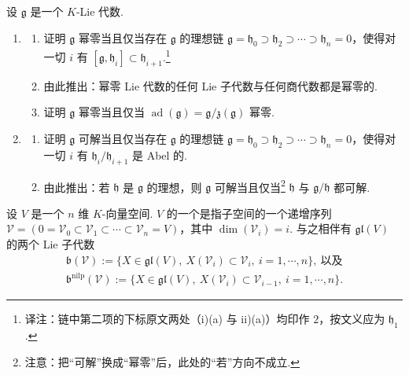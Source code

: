 \begin{exercise*}
设 $\mathfrak{g}$ 是一个 $K$-Lie 代数.
\begin{enumerate}[label=\roman*)]
\item
\begin{enumerate}[label=(\alph*)]
\item 证明 $\mathfrak{g}$ 幂零当且仅当存在 $\mathfrak{g}$ 的理想链 $\mathfrak{g} = \mathfrak{h}_0 \supset \mathfrak{h}_2 \supset \cdots \supset \mathfrak{h}_n = 0$，使得对一切 $i$ 有 $[\mathfrak{g}, \mathfrak{h}_i] \subset \mathfrak{h}_{i+1}$.\footnote{译注：链中第二项的下标原文两处（i)(a) 与 ii)(a)）均印作 $2$，按文义应为 $\mathfrak{h}_1$.}
\item 由此推出：幂零 Lie 代数的任何 Lie 子代数与任何商代数都是幂零的.
\item 证明 $\mathfrak{g}$ 幂零当且仅当 $\operatorname{ad}(\mathfrak{g}) = \mathfrak{g}/\mathfrak{z}(\mathfrak{g})$ 幂零.
\end{enumerate}
\item
\begin{enumerate}[label=(\alph*)]
\item 证明 $\mathfrak{g}$ 可解当且仅当存在 $\mathfrak{g}$ 的理想链 $\mathfrak{g} = \mathfrak{h}_0 \supset \mathfrak{h}_2 \supset \cdots \supset \mathfrak{h}_n = 0$，使得对一切 $i$ 有 $\mathfrak{h}_i/\mathfrak{h}_{i+1}$ 是 Abel 的.
\item 由此推出：若 $\mathfrak{h}$ 是 $\mathfrak{g}$ 的理想，则 $\mathfrak{g}$ 可解当且仅当\footnote{注意：把``可解''换成``幂零''后，此处的``若''方向不成立.} $\mathfrak{h}$ 与 $\mathfrak{g}/\mathfrak{h}$ 都可解.
\end{enumerate}
\end{enumerate}
\end{exercise*}
\begin{definition}\label{def:ssl-2-4-2}
设 $V$ 是一个 $n$ 维 $K$-向量空间. $V$ 的一个是指子空间的一个递增序列 $\mathcal{V} = (0 = \mathcal{V}_0 \subset \mathcal{V}_1 \subset \cdots \subset \mathcal{V}_n = V)$，其中 $\dim(\mathcal{V}_i) = i$. 与之相伴有 $\mathfrak{gl}(V)$ 的两个 Lie 子代数
\[\begin{gathered}
\mathfrak{b}(\mathcal{V}) := \{X \in \mathfrak{gl}(V),\ X(\mathcal{V}_i) \subset \mathcal{V}_i,\ i = 1, \cdots, n\},\ \text{以及}\\
\mathfrak{b}^{\mathrm{nilp}}(\mathcal{V}) := \{X \in \mathfrak{gl}(V),\ X(\mathcal{V}_i) \subset \mathcal{V}_{i-1},\ i = 1, \cdots, n\}.
\end{gathered}\]
\end{definition}
